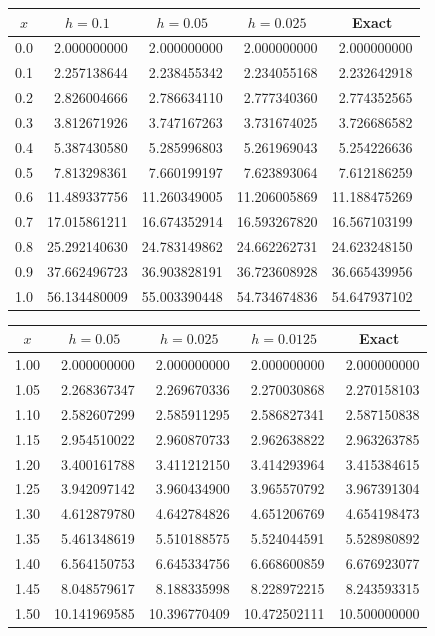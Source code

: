 \documentclass[dvips]{book}
\renewcommand{\exer}[1]{\par\medskip\;\noindent{\color{red}\bf #1.}}
\numberwithin{example}{section}
\numberwithin{equation}{section}
\numberwithin{theorem}{section}
\numberwithin{table}{section}
\numberwithin{figure}{section}
\begin{document}
\exer{3.2.6}
{\small
\begin{tabular}{|c|r|r|r|r|}\hline
\multicolumn{1}{|c|}{$x$}&
\multicolumn{1}{|c|}{$h=0.1$}&
\multicolumn{1}{|c|}{$h=0.05$}&
\multicolumn{1}{|c|}{$h=0.025$}&
\multicolumn{1}{|c|}{Exact}\\ \hline
0.0 &  2.000000000 &  2.000000000 &  2.000000000 &   2.000000000 \\
0.1 &  2.257138644 &  2.238455342 &  2.234055168 &   2.232642918 \\
0.2 &  2.826004666 &  2.786634110 &  2.777340360 &   2.774352565 \\
0.3 &  3.812671926 &  3.747167263 &  3.731674025 &   3.726686582 \\
0.4 &  5.387430580 &  5.285996803 &  5.261969043 &   5.254226636 \\
0.5 &  7.813298361 &  7.660199197 &  7.623893064 &   7.612186259 \\
0.6 & 11.489337756 & 11.260349005 & 11.206005869 &  11.188475269 \\
0.7 & 17.015861211 & 16.674352914 & 16.593267820 &  16.567103199 \\
0.8 & 25.292140630 & 24.783149862 & 24.662262731 &  24.623248150 \\
0.9 & 37.662496723 & 36.903828191 & 36.723608928 &  36.665439956 \\
1.0 & 56.134480009 & 55.003390448 & 54.734674836 &  54.647937102 \\
\hline
\end{tabular}}

\exer{3.2.8}
{\small
\begin{tabular}{|c|r|r|r|r|}\hline
\multicolumn{1}{|c|}{$x$}&
\multicolumn{1}{|c|}{$h=0.05$}&
\multicolumn{1}{|c|}{$h=0.025$}&
\multicolumn{1}{|c|}{$h=0.0125$}&
\multicolumn{1}{|c|}{Exact}\\ \hline
1.00 & 2.000000000  &  2.000000000 &  2.000000000 &  2.000000000 \\
1.05 & 2.268367347  &  2.269670336 &  2.270030868 &  2.270158103 \\
1.10 & 2.582607299  &  2.585911295 &  2.586827341 &  2.587150838 \\
1.15 & 2.954510022  &  2.960870733 &  2.962638822 &  2.963263785 \\
1.20 & 3.400161788  &  3.411212150 &  3.414293964 &  3.415384615 \\
1.25 & 3.942097142  &  3.960434900 &  3.965570792 &  3.967391304 \\
1.30 & 4.612879780  &  4.642784826 &  4.651206769 &  4.654198473 \\
1.35 & 5.461348619  &  5.510188575 &  5.524044591 &  5.528980892 \\
1.40 & 6.564150753  &  6.645334756 &  6.668600859 &  6.676923077 \\
1.45 & 8.048579617  &  8.188335998 &  8.228972215 &  8.243593315 \\
1.50 &10.141969585  & 10.396770409 & 10.472502111 & 10.500000000 \\
\hline
\end{tabular}}
\end{document}
